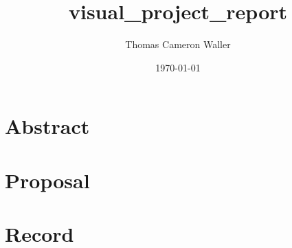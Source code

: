\documentclass[11pt, twoside]{report}
\title{visual_project_report}
\author{Thomas Cameron Waller}
\date{\today}
\begin{document}


\chapter*{Abstract}
\thispagestyle{empty}


\tableofcontents
\thispagestyle{empty}
\listoffigures
\thispagestyle{empty}

\chapter{Proposal}
\thispagestyle{fancy}

\newpage

\chapter{Record}
\thispagestyle{fancy}

\newpage

\printbibliography
\end{document}
